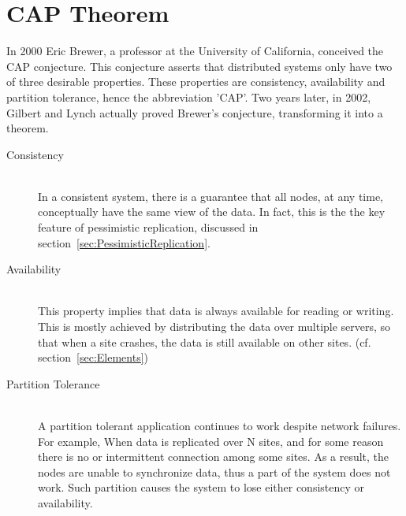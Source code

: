 \documentclass[a4paper,12pt]{report}
\begin{document}
\section{CAP Theorem}\label{sec:CAPTheorem}

In 2000 Eric Brewer, a professor at the University of California, conceived the CAP conjecture. This conjecture asserts that distributed systems only have two of three desirable properties. These properties are consistency, availability and partition tolerance, hence the abbreviation 'CAP'. Two years later, in 2002, Gilbert and Lynch actually proved Brewer's conjecture, transforming it into a theorem.

\begin{description}
    \item[Consistency] \hfill \\In a consistent system, there is a guarantee that all nodes, at any time, conceptually have the same view of the data. In fact, this is the the key feature of pessimistic replication, discussed in section~\ref{sec:PessimisticReplication}.
    \item[Availability] \hfill \\This property implies that data is always available for reading or writing. This is mostly achieved by distributing the data over multiple servers, so that when a site crashes, the data is still available on other sites. (cf. section~\ref{sec:Elements})
    \item[Partition Tolerance] \hfill \\A partition tolerant application continues to work despite network failures. For example, When data is replicated over N sites, and for some reason there is no or intermittent connection among some sites. As a result, the nodes are unable to synchronize data, thus a part of the system does not work. Such partition causes the system to lose either consistency or availability.
\end{description}
\end{document}

